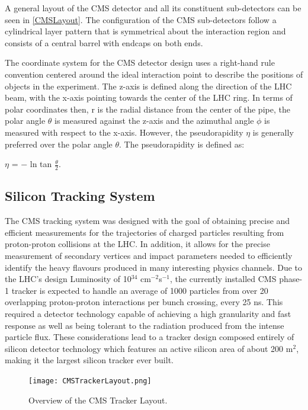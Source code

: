 A general layout of the CMS detector and all its constituent sub-detectors can be seen in \autoref{CMSLayout}. The configuration of the CMS sub-detectors follow a cylindrical layer pattern that is symmetrical about the interaction region and consists of a central barrel with endcaps on both ends.

The coordinate system for the CMS detector design uses a right-hand rule convention centered around the ideal interaction point to describe the positions of objects in the experiment. The z-axis is defined along the direction of the LHC beam, with the x-axis pointing towards the center of the LHC ring. In terms of polar coordinates then, r is the radial distance from the center of the pipe, the polar angle $\theta$ is measured against the z-axis and the azimuthal angle $\phi$ is measured with respect to the x-axis. However, the pseudorapidity $\eta$ is generally preferred over the polar angle $\theta$. The pseudorapidity is defined as:

\begin{center}
$\eta$ =  $-$ ln tan $\frac{\theta}{2}$.
\end{center}

\subsection{Silicon Tracking System}

The CMS tracking system was designed with the goal of obtaining precise and efficient measurements for the trajectories of charged particles resulting from proton-proton collisions at the LHC. 
In addition, it allows for the precise measurement of secondary vertices and impact parameters needed to efficiently identify the heavy flavours produced in many interesting physics channels. Due to the LHC's design Luminosity of 10$^{34}$ cm$^{-2}$s$^{-1}$, the currently installed CMS phase-1 tracker is expected to handle an average of 1000 particles from over 20 overlapping proton-proton interactions per bunch crossing, every 25 ns. This required a detector technology capable of achieving a high granularity and fast response as well as being tolerant to the radiation produced from the intense particle flux. These considerations lead to a tracker design composed entirely of silicon detector technology which features an active silicon area of about 200 m$^2$, making it the largest silicon tracker ever built\cite{CMSdet1}.\\

\begin{figure}[tb]
\begin{center}
\texttt{[image: CMSTrackerLayout.png]} 
\caption{Overview of the CMS Tracker Layout\cite{CMSdet2}.}
\label{CMSTrackerLayout} 
\end{center}
\end{figure}

